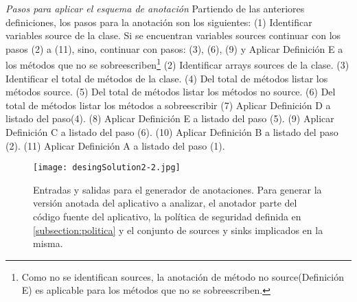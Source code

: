 \textit{Pasos para aplicar el esquema de anotación}\newline
\label{subsec:pasosSol}
Partiendo de las anteriores definiciones, los pasos para la anotación son los
siguientes:\newline
(1) Identificar variables source de la clase. Si se encuentran variables sources
continuar con los pasos (2) a (11), sino, continuar con pasos: (3), (6), (9) y
Aplicar Definición E a los métodos que no se sobreescriben\footnote{Como no se
identifican sources, la anotación de método no source(Definición E) es
aplicable para los métodos que no se sobreescriben.}\newline
(2) Identificar arrays sources de la clase.\newline
(3) Identificar el total de métodos de la clase.\newline
(4) Del total de métodos listar los métodos source.\newline
(5) Del total de métodos listar los métodos no source.\newline
(6) Del total de métodos listar los métodos a sobreescribir\newline
(7) Aplicar Definición D a listado del paso(4).\newline
(8) Aplicar Definición E a listado del paso (5).\newline
(9) Aplicar Definición C a listado del paso (6).\newline
(10) Aplicar Definición B a listado del paso (2).\newline
(11) Aplicar Definición A a listado del paso (1).

\begin{figure}[t]
	\begin{center}
	\texttt{[image: desingSolution2-2.jpg]}
	\end{center}
	\caption{Entradas y salidas para el generador de anotaciones.\newline
	Para generar la versión anotada del aplicativo a analizar, el anotador parte
	del código fuente del aplicativo, la política de seguridad definida en
	\ref{subsection:politica} y el conjunto de sources y sinks implicados en la misma.}
	\label{fig:desingSolution}
\end{figure}


